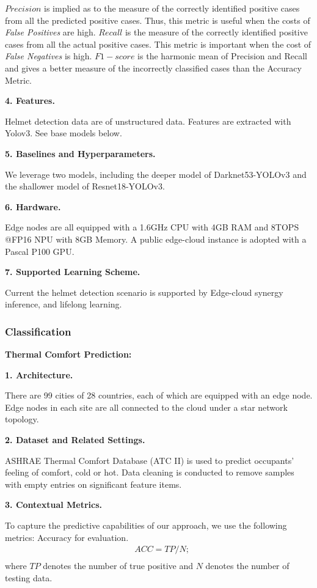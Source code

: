 $Precision$ is implied as to the measure of the correctly identified positive cases from all the predicted positive cases. Thus, this metric is useful when the costs of \textit{False Positives} are high. $Recall$ is the measure of the correctly identified positive cases from all the actual positive cases. This metric is important when the cost of \textit{False Negatives} is high. $F1-score$ is the harmonic mean of Precision and Recall and gives a better measure of the incorrectly classified cases than the Accuracy Metric.

\textbf{4. Features.}

Helmet detection data are of unstructured data. Features are extracted with Yolov3. See base models below. 

\textbf{5. Baselines and Hyperparameters.}

We leverage two models, including the deeper model of  Darknet53-YOLOv3 and the shallower model of Resnet18-YOLOv3. 


\textbf{6. Hardware.}

Edge nodes are all equipped with a 1.6GHz CPU with 4GB RAM and 8TOPS @FP16 NPU with 8GB Memory. A public edge-cloud instance is adopted with a Pascal P100 GPU. 

\textbf{7. Supported Learning Scheme.}

Current the helmet detection scenario is supported by Edge-cloud synergy inference, and lifelong learning.



\subsubsection{Classification}

\textbf{Thermal Comfort Prediction:} 

\textbf{1. Architecture.}

There are 99 cities of 28 countries, each of which are equipped with an edge node. Edge nodes in each site are all connected to the cloud under a star network topology.

\textbf{2. Dataset and Related Settings.}

ASHRAE Thermal Comfort Database (ATC II) is used to predict occupants' feeling of comfort, cold or hot. Data cleaning is conducted to remove samples with empty entries on significant feature items.

\textbf{3. Contextual Metrics.} 

To capture the predictive capabilities of our approach, we use the following metrics: Accuracy for evaluation.
\noindent
\begin{equation*}
\begin{split}
&ACC = TP / N; \\
\end{split}
\end{equation*}
where $TP$ denotes the number of true positive and $N$ denotes the number of testing data. 

